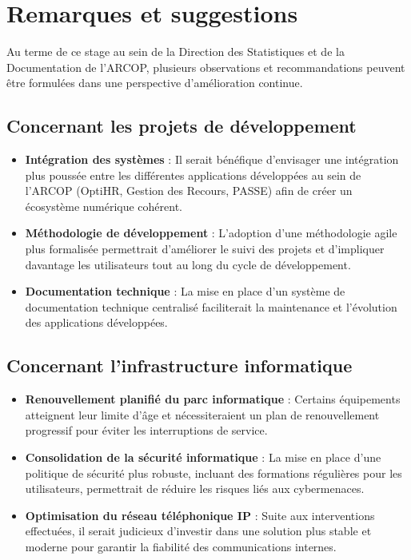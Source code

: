 \section{Remarques et suggestions}

Au terme de ce stage au sein de la Direction des Statistiques et de la Documentation de l'ARCOP, plusieurs observations et recommandations peuvent être formulées dans une perspective d'amélioration continue.

\subsection{Concernant les projets de développement}

\begin{itemize}
    \item \textbf{Intégration des systèmes} : Il serait bénéfique d'envisager une intégration plus poussée entre les différentes applications développées au sein de l'ARCOP (OptiHR, Gestion des Recours, PASSE) afin de créer un écosystème numérique cohérent.
    
    \item \textbf{Méthodologie de développement} : L'adoption d'une méthodologie agile plus formalisée permettrait d'améliorer le suivi des projets et d'impliquer davantage les utilisateurs tout au long du cycle de développement.
    
    \item \textbf{Documentation technique} : La mise en place d'un système de documentation technique centralisé faciliterait la maintenance et l'évolution des applications développées.
\end{itemize}

\subsection{Concernant l'infrastructure informatique}

\begin{itemize}
    \item \textbf{Renouvellement planifié du parc informatique} : Certains équipements atteignent leur limite d'âge et nécessiteraient un plan de renouvellement progressif pour éviter les interruptions de service.
    
    \item \textbf{Consolidation de la sécurité informatique} : La mise en place d'une politique de sécurité plus robuste, incluant des formations régulières pour les utilisateurs, permettrait de réduire les risques liés aux cybermenaces.
    
    \item \textbf{Optimisation du réseau téléphonique IP} : Suite aux interventions effectuées, il serait judicieux d'investir dans une solution plus stable et moderne pour garantir la fiabilité des communications internes.
\end{itemize}

